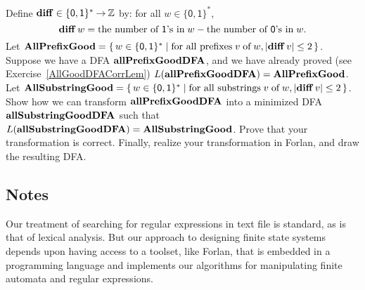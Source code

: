 \begin{exercise}
Define $\mathbf{diff}\in\{\mathsf{0,1}\}^*\mathbin{\to}\mathbb{Z}$ by:
%
%
%
%
for all $w\in\{\mathsf{0,1}\}^*$,
\begin{displaymath}
\mathbf{diff}\,w =
\allowbreak\mbox{the number of $\mathsf{1}$'s in}\allowbreak\;w -
\allowbreak\mbox{the number of $\mathsf{0}$'s in}\allowbreak\;w .
\end{displaymath}
Let
$\mathbf{AllPrefixGood} = \{ \, w\in\{\mathsf{0,1}\}^* \mid \allowbreak\mbox{for all
    prefixes}\allowbreak\; v\;\allowbreak\mbox{of}\allowbreak\;w, |\mathbf{diff}\,v|\leq 2 \, \}$.  Suppose we have a DFA
$\mathbf{allPrefixGoodDFA}$, and we have already proved (see
Exercise~\ref{AllGoodDFACorrLem})
$L(\mathbf{allPrefixGoodDFA}) = \mathbf{AllPrefixGood}$. Let
$\mathbf{AllSubstringGood} = \{ \, w\in\{\mathsf{0,1}\}^* \mid \allowbreak\mbox{for all
    substrings}\allowbreak\; v\;\allowbreak\mbox{of}\allowbreak\;w, |\mathbf{diff}\,v|\leq 2 \, \}$.  Show how we can
transform $\mathbf{allPrefixGoodDFA}$ into a minimized DFA
$\mathbf{allSubstringGoodDFA}$ such that
$L(\mathbf{allSubstringGoodDFA}) = \mathbf{AllSubstringGood}$. Prove that your
transformation is correct. Finally, realize your transformation in
Forlan, and draw the resulting DFA.
\end{exercise}

%
%

\subsection{Notes}

Our treatment of searching for regular expressions in text file is
standard, as is that of lexical analysis.  But our approach to
designing finite state systems depends upon having access to a
toolset, like Forlan, that is embedded in a programming language and
implements our algorithms for manipulating finite automata and regular
expressions.

